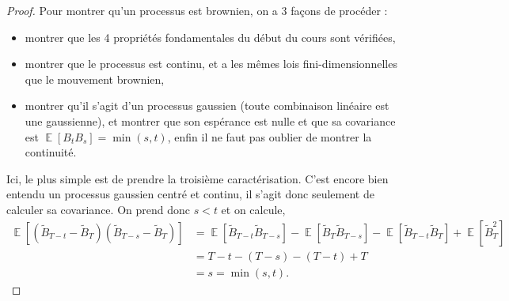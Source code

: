\documentclass{article}
\theoremstyle{definition}
\numberwithin{equation}{section}
\DeclareMathOperator{\E}{\mathbb{E}}
\begin{document}
\begin{proof}
Pour montrer qu'un processus est brownien, on a 3 façons de procéder :
\begin{itemize}
    \item montrer que les 4 propriétés fondamentales du début du cours sont vérifiées,
    \item montrer que le processus est continu, et a les mêmes lois fini-dimensionnelles que le mouvement brownien,
    \item montrer qu'il s'agit d'un processus gaussien (toute combinaison linéaire est une gaussienne), et montrer que son espérance est nulle et que sa covariance est $\E[B_tB_s] = \min(s,t)$, enfin il ne faut pas oublier de montrer la continuité.
\end{itemize}
Ici, le plus simple est de prendre la troisième caractérisation. C'est encore bien entendu un processus gaussien centré et continu, il s'agit donc seulement de calculer sa covariance. On prend donc $s<t$ et on calcule,
\begin{align*}
    \E[(\tilde{B}_{T-t}-\tilde{B}_{T})(\tilde{B}_{T-s}-\tilde{B}_{T})] &= \E[\tilde{B}_{T-t}\tilde{B}_{T-s}]-\E[\tilde{B}_{T}\tilde{B}_{T-s}]-\E[\tilde{B}_{T-t}\tilde{B}_{T}]+\E[\tilde{B}_{T}^2]\\
    &=T-t - (T-s) - (T-t) + T \\
    &=s = \min(s,t).
\end{align*}
\end{proof}
\end{document}

